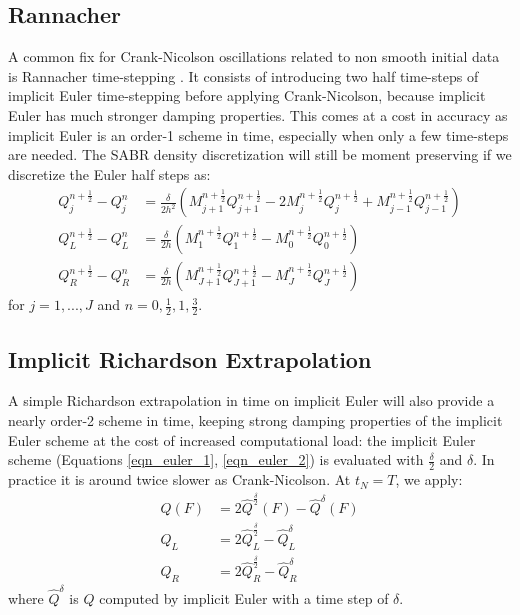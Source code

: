 \documentclass[]{rAMF2e}
\begin{document}
\subsection{Rannacher}
A common fix for Crank-Nicolson oscillations related to non smooth initial data is Rannacher time-stepping \citep{rannacher1984finite, GiCa2006}. It consists of introducing two half time-steps of implicit Euler time-stepping before applying Crank-Nicolson, because implicit Euler has much stronger damping properties. This comes at a cost in accuracy as implicit Euler is an order-1 scheme in time, especially when only a few time-steps are needed. 
The SABR density discretization will still be moment preserving if we discretize the Euler half steps as:
\begin{align}\label{eqn_euler_1}
Q_j^{n+\frac{1}{2}}-Q_j^n &= \frac{\delta}{2h^2} \left(M_{j+1}^{n+\frac{1}{2}}Q_{j+1}^{n+\frac{1}{2}}-2M_j^{n+\frac{1}{2}}Q_j^{n+\frac{1}{2}}+M_{j-1}^{n+\frac{1}{2}}Q_{j-1}^{n+\frac{1}{2}} \right) \\
\label{eqn_euler_2}
Q_L^{n+\frac{1}{2}}-Q_L^n &= \frac{\delta}{2h} \left(M_{1}^{n+\frac{1}{2}}Q_{1}^{n+\frac{1}{2}}-M_0^{n+\frac{1}{2}}Q_0^{n+\frac{1}{2}}\right) \\
Q_R^{n+\frac{1}{2}}-Q_R^n &= \frac{\delta}{2h} \left(M_{J+1}^{n+\frac{1}{2}}Q_{J+1}^{n+\frac{1}{2}}-M_J^{n+\frac{1}{2}}Q_J^{n+\frac{1}{2}}\right) 
\end{align}
for $j=1,...,J$ and $n=0,\frac{1}{2}, 1, \frac{3}{2}$.

\subsection{Implicit Richardson Extrapolation}
A simple Richardson extrapolation in time \citep{richardson1911approximate} on implicit Euler will also provide a nearly order-2 scheme in time, keeping strong damping properties of the implicit Euler scheme at the cost of increased computational load: the implicit Euler scheme (Equations \ref{eqn_euler_1}, \ref{eqn_euler_2}) is evaluated with $\frac{\delta}{2}$ and $\delta$. In practice it is around twice slower as Crank-Nicolson. At $t_N=T$, we apply:
\begin{align}\label{eqn_richardson}
Q(F) &= 2 \hat{Q}^{\frac{\delta}{2}}(F) - \hat{Q}^{\delta}(F) \\
Q_L &= 2 \hat{Q}^{\frac{\delta}{2}}_L - \hat{Q}^{\delta}_L\\
Q_R &= 2 \hat{Q}^{\frac{\delta}{2}}_R - \hat{Q}^{\delta}_R
\end{align}
where $\hat{Q}^{\delta}$ is $Q$ computed by implicit Euler with a time step of $\delta$.
\end{document}
